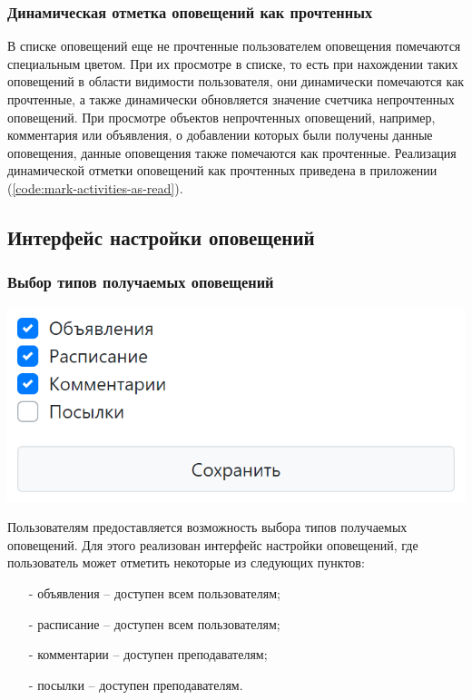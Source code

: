 \documentclass[14pt, a4paper, oneside]{extarticle}
\begin{document}
\subsubsection{Динамическая отметка оповещений как прочтенных}
В списке оповещений еще не прочтенные пользователем оповещения помечаются специальным цветом. При их просмотре в списке, то есть при нахождении таких оповещений в области видимости пользователя, они динамически помечаются как прочтенные, а также динамически обновляется значение счетчика непрочтенных оповещений. При просмотре объектов непрочтенных оповещений, например, комментария или объявления, о добавлении которых были получены данные оповещения, данные оповещения также помечаются как прочтенные. Реализация динамической отметки оповещений как прочтенных приведена в приложении (\ref{code:mark-activities-as-read}).
\subsection{Интерфейс настройки оповещений}
\subsubsection{Выбор типов получаемых оповещений}
\begin{center}
    \includegraphics[scale=0.45]{activity-settings}
\end{center}

Пользователям предоставляется возможность выбора типов получаемых оповещений. Для этого реализован интерфейс настройки оповещений, где пользователь может отметить некоторые из следующих пунктов:
\begin{itemize}
    \item [-] объявления – доступен всем пользователям;
    \item [-] расписание – доступен всем пользователям;
    \item [-] комментарии – доступен преподавателям;
    \item [-] посылки – доступен преподавателям.
\end{itemize}
\end{document}
